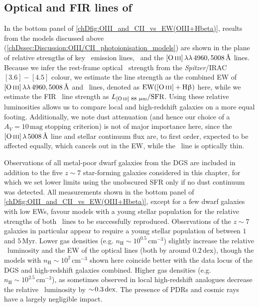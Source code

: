 \subsection{Optical and FIR lines of \texorpdfstring{\OIIIf}{[O III]}}
\label{chDssec:Discussion:OIII_lines}

In the bottom panel of \cref{chDfig:OIII_and_CII_vs_EW(OIII+Hbeta)}, results from the  models discussed above (\cref{chDssec:Discussion:OIII/CII_photoionisation_models}) are shown in the plane of relative strengths of key \OIIIf\ emission lines, \OIIILam\ and the $\OIIIf \, \lambda \lambda \, 4960, 5008 \, \Angstrom$ lines. Because we infer the rest-frame optical \OIIIf\ strength from the \textit{Spitzer}/IRAC $[3.6]-[4.5]$ colour, we estimate the line strength as the combined EW of $\OIIIf \, \lambda \lambda \, 4960, 5008 \, \Angstrom$ and \Hbeta\ lines, denoted as $\text{EW} ( \OIIIf + \Hbeta )$ here, while we estimate the FIR \OIIILam\ line strength as $L_\text{\OIIILam}/\text{SFR}$. Using these relative luminosities allows us to compare local and high-redshift galaxies on a more equal footing. Additionally, we note dust attenuation (and hence our choice of a $A_V = 10 \, \mathrm{mag}$ stopping criterion) is not of major importance here, since the $\OIIIf \, \lambda \, 5008 \, \Angstrom$ line and stellar continuum flux are, to first order, expected to be affected equally, which cancels out in the EW, while the \OIIILam\ line is optically thin.

Observations of all metal-poor dwarf galaxies from the DGS are included in addition to the five $z \sim 7$ star-forming galaxies considered in this chapter, for which we set lower limits using the unobscured SFR only if no dust continuum was detected. All measurements shown in the bottom panel of \cref{chDfig:OIII_and_CII_vs_EW(OIII+Hbeta)}, except for a few dwarf galaxies with low EWs, favour models with a young stellar population for the relative strengths of both \OIIIf\ lines to be successfully reproduced. Observations of the $z \sim 7$ galaxies in particular appear to require a young stellar population of between $1$ and $5 \, \mathrm{Myr}$. Lower gas densities (e.g. $n_\text{H} \sim 10^{0.5} \, \mathrm{cm^{-3}}$) slightly increase the relative \OIIIf\ luminosity and the EW of the optical lines (both by around $0.2 \, \mathrm{dex}$), though the models with $n_\text{H} \sim 10^2 \, \mathrm{cm^{-3}}$ shown here coincide better with the data locus of the DGS and high-redshift galaxies combined. Higher gas densities (e.g. $n_\text{H} \sim 10^{2.5} \, \mathrm{cm^{-3}}$), as sometimes observed in local high-redshift analogues \citep[e.g.][]{2016ApJ...827..126B} decrease the relative \OIIIf\ luminosity by $\sim \! 0.3 \, \mathrm{dex}$. The presence of PDRs and cosmic rays have a largely negligible impact.

